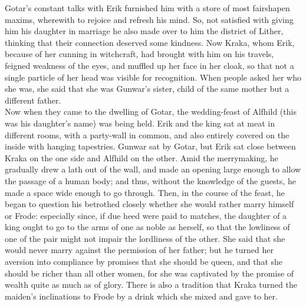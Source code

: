 \documentclass[10pt,a4paper]{report}
\begin{document}
Gotar's constant talks with Erik furnished him with a store of most fairshapen maxims, wherewith to rejoice and refresh his mind. So, not satisfied with giving him his daughter in marriage he also made over to him the district of Lither, thinking that their connection deserved some kindness. Now Kraka, whom Erik, because of her cunning in witchcraft, had brought with him on his travels, feigned weakness of the eyes, and muffled up her face in her cloak, so that not a single particle of her head was visible for recognition. When people asked her who she was, she said that she was Gunwar's sister, child of the same mother but a different father.\\

Now when they came to the dwelling of Gotar, the wedding-feast of Alfhild (this was his daughter's name) was being held. Erik and the king sat at meat in different rooms, with a party-wall in common, and also entirely covered on the inside with hanging tapestries. Gunwar sat by Gotar, but Erik sat close between Kraka on the one side and Alfhild on the other. Amid the merrymaking, he gradually drew a lath out of the wall, and made an opening large enough to allow the passage of a human body; and thus, without the knowledge of the guests, he made a space wide enough to go through. Then, in the course of the feast, he began to question his betrothed closely whether she would rather marry himself or Frode: especially since, if due heed were paid to matches, the daughter of a king ought to go to the arms of one as noble as herself, so that the lowliness of one of the pair might not impair the lordliness of the other. She said that she would never marry against the permission of her father; but he turned her aversion into compliance by promises that she should be queen, and that she should be richer than all other women, for she was captivated by the promise of wealth quite as much as of glory. There is also a tradition that Kraka turned the maiden's inclinations to Frode by a drink which she mixed and gave to her.\\
\end{document}

